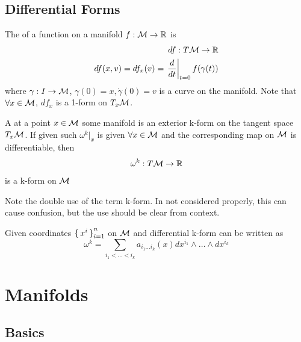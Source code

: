 \documentclass{article}
\begin{document}
\subsection{Differential Forms}

\begin{definition}[Differential]
The  of a function on a manifold $f:\mathcal{M}\to\mathbb{R}$ is 
\begin{align*}
    df : T\mathcal{M} \to \mathbb{R} \\
    df(x,v) = df_x(v) = \left. \frac{d}{dt} \right\rvert_{t=0} f(\gamma(t))
\end{align*}
where $\gamma:I\to\mathcal{M}$, $\gamma(0)=x, \dot{\gamma}(0)=v$ is a curve on the manifold. Note that $\forall x\in\mathcal{M}$, $df_x$ is a 1-form on $T_x \mathcal{M}$.
\end{definition}

\begin{definition}
A  at a point $x\in\mathcal{M}$ some manifold is an exterior k-form on the tangent space $T_x\mathcal{M}$. If given such $\omega^k\rvert_x$ is given $\forall x\in \mathcal{M}$ and the corresponding map on $\mathcal{M}$ is differentiable, then
\begin{align*}
    \omega^k : T\mathcal{M} \to \mathbb{R}
\end{align*}
is a k-form on $\mathcal{M}$
\end{definition}

\begin{remark}
Note the double use of the term k-form. In not considered properly, this can cause confusion, but the use should be clear from context. 
\end{remark}

\begin{theorem}
Given coordinates $\set{x^i}_{i=1}^n$ on $\mathcal{M}$ and differential k-form can be written as 
\[
\omega^k = \sum_{i_1<\dots<i_k} a_{i_1 \dots i_k}(x) dx^{i_1} \wedge \dots \wedge dx^{i_k}
\]
\end{theorem}

\section{Manifolds}

\subsection{Basics}
\end{document}
